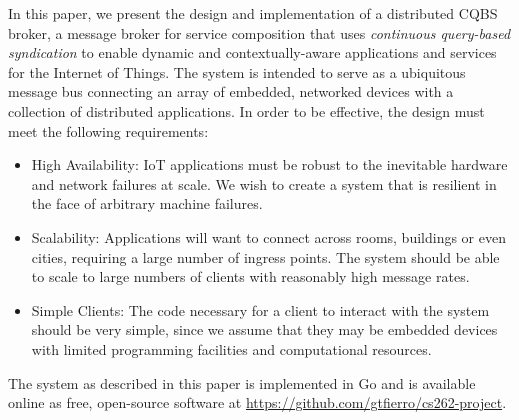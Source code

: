 In this paper, we present the design and implementation of a distributed CQBS broker, a message broker for service composition that uses \emph{continuous query-based syndication} to enable dynamic and contextually-aware applications and services for the Internet of Things.
The system is intended to serve as a ubiquitous message bus connecting an array of embedded, networked devices with a collection of distributed applications.
In order to be effective, the design must meet the following requirements:
\begin{itemize}
\item High Availability: IoT applications must be robust to the inevitable hardware and network failures at scale. We wish to create a system that is resilient in the face of arbitrary machine failures.
\item Scalability: Applications will want to connect across rooms, buildings or even cities, requiring a large number of ingress points. The system should be able to scale to large numbers of clients with reasonably high message rates.
\item Simple Clients: The code necessary for a client to interact with the system should be very simple, since we assume that they may be embedded devices with limited programming facilities and computational resources.
\end{itemize}

The system as described in this paper is implemented in Go and is available online as free, open-source software at \url{https://github.com/gtfierro/cs262-project}.

